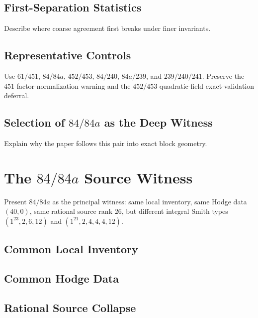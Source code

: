 \subsection{First-Separation Statistics}

Describe where coarse agreement first breaks under finer invariants.

\subsection{Representative Controls}

Use \(61/451\), \(84/84a\), \(452/453\), \(84/240\), \(84a/239\), and
\(239/240/241\).  Preserve the \(451\) factor-normalization warning and the
\(452/453\) quadratic-field exact-validation deferral.

\subsection{Selection of \(84/84a\) as the Deep Witness}

Explain why the paper follows this pair into exact block geometry.

\section{The \(84/84a\) Source Witness}\label{sec:source-witness}


Present \(84/84a\) as the principal witness: same local inventory, same Hodge
data \((40,0)\), same rational source rank \(26\), but different integral Smith
types \((1^{23},2,6,12)\) and \((1^{21},2,4,4,4,12)\).

\subsection{Common Local Inventory}

\subsection{Common Hodge Data}

\subsection{Rational Source Collapse}

